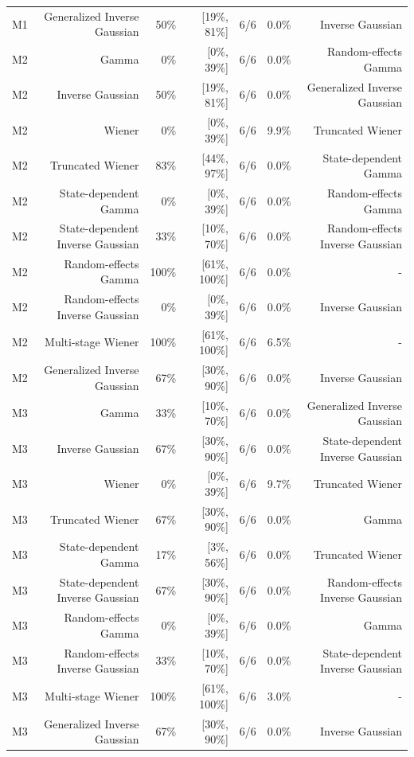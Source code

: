 \begin{table}[t]
\begin{tabular}{lrrrrrr}
M1 & Generalized Inverse Gaussian & 50\% & [19\%, 81\%] & 6/6 & 0.0\% & Inverse Gaussian \\
M2 & Gamma & 0\% & [0\%, 39\%] & 6/6 & 0.0\% & Random-effects Gamma \\
M2 & Inverse Gaussian & 50\% & [19\%, 81\%] & 6/6 & 0.0\% & Generalized Inverse Gaussian \\
M2 & Wiener & 0\% & [0\%, 39\%] & 6/6 & 9.9\% & Truncated Wiener \\
M2 & Truncated Wiener & 83\% & [44\%, 97\%] & 6/6 & 0.0\% & State-dependent Gamma \\
M2 & State-dependent Gamma & 0\% & [0\%, 39\%] & 6/6 & 0.0\% & Random-effects Gamma \\
M2 & State-dependent Inverse Gaussian & 33\% & [10\%, 70\%] & 6/6 & 0.0\% & Random-effects Inverse Gaussian \\
M2 & Random-effects Gamma & 100\% & [61\%, 100\%] & 6/6 & 0.0\% & - \\
M2 & Random-effects Inverse Gaussian & 0\% & [0\%, 39\%] & 6/6 & 0.0\% & Inverse Gaussian \\
M2 & Multi-stage Wiener & 100\% & [61\%, 100\%] & 6/6 & 6.5\% & - \\
M2 & Generalized Inverse Gaussian & 67\% & [30\%, 90\%] & 6/6 & 0.0\% & Inverse Gaussian \\
M3 & Gamma & 33\% & [10\%, 70\%] & 6/6 & 0.0\% & Generalized Inverse Gaussian \\
M3 & Inverse Gaussian & 67\% & [30\%, 90\%] & 6/6 & 0.0\% & State-dependent Inverse Gaussian \\
M3 & Wiener & 0\% & [0\%, 39\%] & 6/6 & 9.7\% & Truncated Wiener \\
M3 & Truncated Wiener & 67\% & [30\%, 90\%] & 6/6 & 0.0\% & Gamma \\
M3 & State-dependent Gamma & 17\% & [3\%, 56\%] & 6/6 & 0.0\% & Truncated Wiener \\
M3 & State-dependent Inverse Gaussian & 67\% & [30\%, 90\%] & 6/6 & 0.0\% & Random-effects Inverse Gaussian \\
M3 & Random-effects Gamma & 0\% & [0\%, 39\%] & 6/6 & 0.0\% & Gamma \\
M3 & Random-effects Inverse Gaussian & 33\% & [10\%, 70\%] & 6/6 & 0.0\% & State-dependent Inverse Gaussian \\
M3 & Multi-stage Wiener & 100\% & [61\%, 100\%] & 6/6 & 3.0\% & - \\
M3 & Generalized Inverse Gaussian & 67\% & [30\%, 90\%] & 6/6 & 0.0\% & Inverse Gaussian \\
\bottomrule
\end{tabular}
\end{table}
